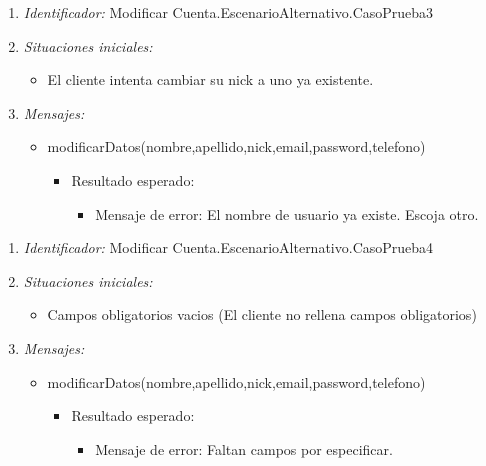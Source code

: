 \begin{enumerate}
	\item {\it Identificador:} Modificar Cuenta.EscenarioAlternativo.CasoPrueba3
	\item {\it Situaciones iniciales:} 
    		\begin{itemize}
    			\item El cliente intenta cambiar su nick a uno ya existente.
		\end{itemize}
	\item {\it Mensajes:}
		\begin{itemize}
			\item modificarDatos(nombre,apellido,nick,email,password,telefono)
				\begin{itemize}
					 \item Resultado esperado:
					 \begin{itemize}
		       			 \item Mensaje de error: El nombre de usuario ya existe. Escoja otro.
					 \end{itemize}
				\end{itemize}
		\end{itemize}
\end{enumerate}

\begin{enumerate}
	\item {\it Identificador:} Modificar Cuenta.EscenarioAlternativo.CasoPrueba4
	\item {\it Situaciones iniciales:} 
    		\begin{itemize}
    			\item Campos obligatorios vacios (El cliente no rellena campos obligatorios)
		\end{itemize}
	\item {\it Mensajes:}
		\begin{itemize}
			\item modificarDatos(nombre,apellido,nick,email,password,telefono)
				\begin{itemize}
					 \item Resultado esperado:
					 \begin{itemize}
		       			 \item Mensaje de error: Faltan campos por especificar.
					 \end{itemize}
				\end{itemize}
		\end{itemize}
\end{enumerate}


